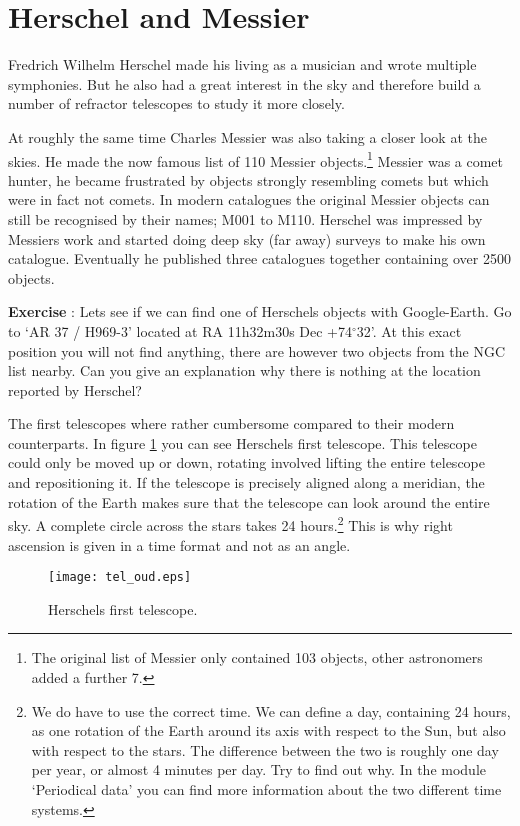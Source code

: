 \section{Herschel and Messier}
Fredrich Wilhelm Herschel made his living as a musician and wrote multiple symphonies. But he also had a great interest in the sky and therefore build a number of refractor telescopes to study it more closely.

At roughly the same time Charles Messier was also taking a closer look at the skies. He made the now famous list of 110 Messier objects.\footnote{The original list of Messier only contained 103 objects, other astronomers added a further 7.} Messier was a comet hunter, he became frustrated by objects strongly resembling comets but which were in fact not comets. In modern catalogues the original Messier objects can still be recognised by their names; M001 to M110. Herschel was impressed by Messiers work and started doing deep sky (far away) surveys to make his own catalogue. Eventually he published three catalogues together containing over 2500 objects.

\begin{shaded}
\textbf{Exercise \theExercise {}} : Lets see if we can find one of Herschels objects with Google-Earth. Go to `AR 37 / H969-3' located at RA 11h32m30s Dec +74$^{\circ}$32'. At this exact position you will not find anything, there are however two objects from the NGC list nearby. Can you give an explanation why there is nothing at the location reported by Herschel?\end{shaded}

The first telescopes where rather cumbersome compared to their modern counterparts. In figure \ref{fig:tel_oud} you can see Herschels first telescope. This telescope could only be moved up or down, rotating  involved lifting the entire telescope and repositioning it. If the telescope is precisely aligned along a meridian, the rotation of the Earth makes sure that the telescope can look around the entire sky. A complete circle across the stars takes 24 hours.\footnote{We do have to use the correct time. We can define a day, containing 24 hours, as one rotation of the Earth around its axis with respect to the Sun, but also with respect to the stars. The difference between the two is roughly one day per year, or almost 4 minutes per day. Try to find out why. In the module `Periodical data' you can find more information about the two different time systems.} This is why right ascension is given in a time format and not as an angle. 
\begin{figure}\begin{center}
\texttt{[image: tel\_oud.eps]}
\caption{Herschels first telescope.}\label{fig:tel_oud}
\end{center}\end{figure} 

